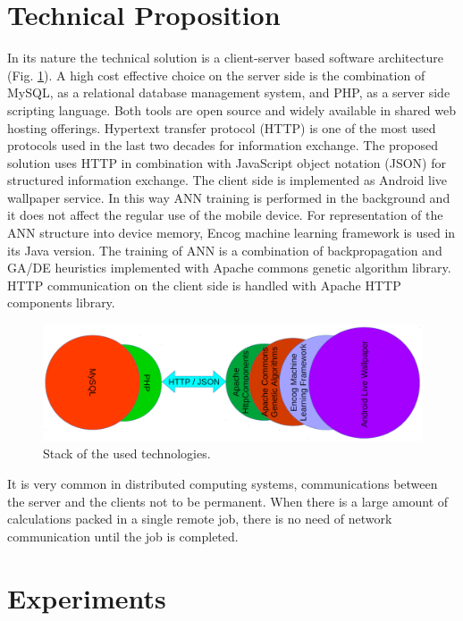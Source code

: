 \documentclass{llncs}
\begin{document}
\section{Technical Proposition} \label{Technical Proposition}

In its nature the technical solution is a client-server based software architecture (Fig. \ref{fig01}). A high cost effective choice on the server side is the combination of MySQL, as a relational database management system, and PHP, as a server side scripting language. Both tools are open source and widely available in shared web hosting offerings. Hypertext transfer protocol (HTTP) is one of the most used protocols used in the last two decades for information exchange. The proposed solution uses HTTP in combination with JavaScript object notation (JSON) for structured information exchange. The client side is implemented as Android live wallpaper service. In this way ANN training is performed in the background and it does not affect the regular use of the mobile device. For representation of the ANN structure into device memory, Encog machine learning framework is used in its Java version. The training of ANN is a combination of backpropagation and GA/DE heuristics implemented with Apache commons genetic algorithm library. HTTP communication on the client side is handled with Apache HTTP components library. 

\begin{figure}
  \includegraphics[width=1.0\linewidth]{fig01}
  \caption{Stack of the used technologies.}
  \label{fig01}
\end{figure}
\FloatBarrier

It is very common in distributed computing systems, communications between the server and the clients not to be permanent. When there is a large amount of calculations packed in a single remote job, there is no need of network communication until the job is completed.

\section{Experiments} \label{Experiments}
\end{document}
